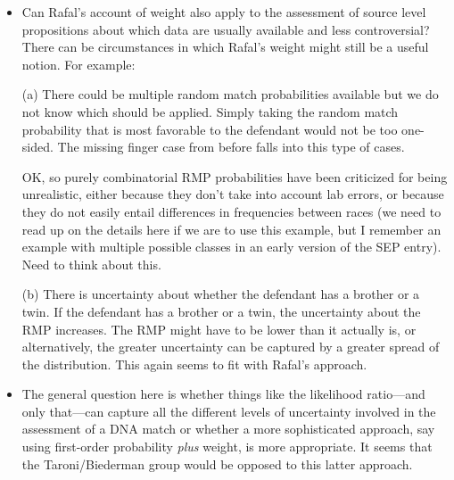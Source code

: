 \documentclass[
  10pt,
  dvipsnames,enabledeprecatedfontcommands]{scrartcl}
\begin{document}
\begin{itemize}
 
 \item Can Rafal's account of weight also apply to the assessment of source level propositions about which data are usually available and less controversial? There can be circumstances in which Rafal's weight might still be a useful notion. For example:
 
 (a) There could be multiple random match probabilities available but we do not know which should be applied. Simply taking the random match probability that is most favorable to the defendant would not be too one-sided. The missing finger case from before falls into this type of cases. 
 
 
\todo{} OK, so purely combinatorial RMP probabilities have been criticized for being unrealistic, either because they don't take into account lab errors, or because they do not easily entail differences in frequencies between races (we need to read up on the details here if we are to use this example, but I remember an example with multiple possible classes in an early version of the SEP entry). Need to think about this.




(b) There is uncertainty about whether the defendant has a brother or a twin. If the defendant has a brother or a twin, the uncertainty about the RMP increases. The RMP might have to be lower than it actually is, or alternatively, the greater uncertainty can be captured by a greater spread of the distribution. This again seems to fit with Rafal's approach.


\item The general question here is whether things like the likelihood ratio---and only that---can capture all the different levels of uncertainty involved in the assessment of a DNA match or whether a more sophisticated approach, say using first-order probability \textit{plus} weight, is more appropriate. It seems that the Taroni/Biederman group would be opposed to this latter approach.



 \end{itemize}
\end{document}
